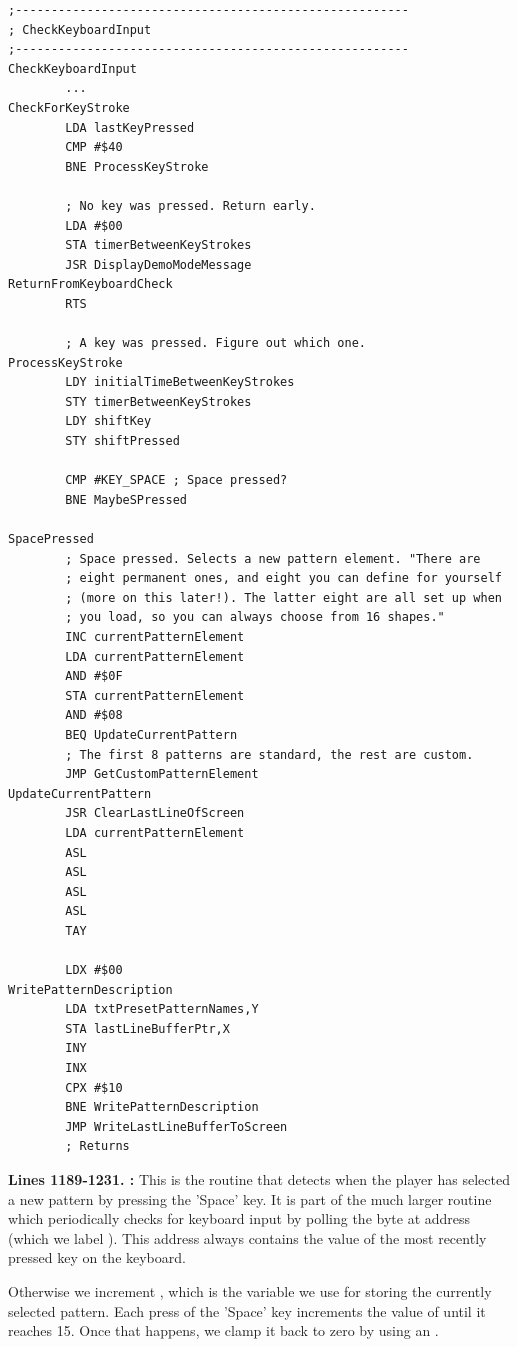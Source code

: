\clearpage
\begin{lstlisting}[basicstyle=\ttfamily\scriptsize]
;-------------------------------------------------------
; CheckKeyboardInput
;-------------------------------------------------------
CheckKeyboardInput   
        ...
CheckForKeyStroke   
        LDA lastKeyPressed
        CMP #$40
        BNE ProcessKeyStroke

        ; No key was pressed. Return early.
        LDA #$00
        STA timerBetweenKeyStrokes
        JSR DisplayDemoModeMessage
ReturnFromKeyboardCheck   
        RTS 

        ; A key was pressed. Figure out which one.
ProcessKeyStroke   
        LDY initialTimeBetweenKeyStrokes
        STY timerBetweenKeyStrokes
        LDY shiftKey
        STY shiftPressed

        CMP #KEY_SPACE ; Space pressed?
        BNE MaybeSPressed

SpacePressed
        ; Space pressed. Selects a new pattern element. "There are
        ; eight permanent ones, and eight you can define for yourself
        ; (more on this later!). The latter eight are all set up when
        ; you load, so you can always choose from 16 shapes."
        INC currentPatternElement
        LDA currentPatternElement
        AND #$0F
        STA currentPatternElement
        AND #$08
        BEQ UpdateCurrentPattern
        ; The first 8 patterns are standard, the rest are custom.
        JMP GetCustomPatternElement
UpdateCurrentPattern   
        JSR ClearLastLineOfScreen
        LDA currentPatternElement
        ASL 
        ASL 
        ASL 
        ASL 
        TAY 

        LDX #$00
WritePatternDescription   
        LDA txtPresetPatternNames,Y
        STA lastLineBufferPtr,X
        INY 
        INX 
        CPX #$10
        BNE WritePatternDescription
        JMP WriteLastLineBufferToScreen
        ; Returns
\end{lstlisting}
\clearpage

\textbf{Lines 1189-1231. :} This is the routine that detects when the player has selected a new
pattern by pressing the 'Space' key. It is part of the much larger routine  which periodically checks
for keyboard input by polling the byte at address  (which we label ). This address always
contains the value of the most recently pressed key on the keyboard.

Otherwise we increment , which is the variable we use for storing the currently selected pattern.
Each press of the 'Space' key increments the value of  until it reaches 15. Once that happens, we 
clamp it back to zero by using an .

